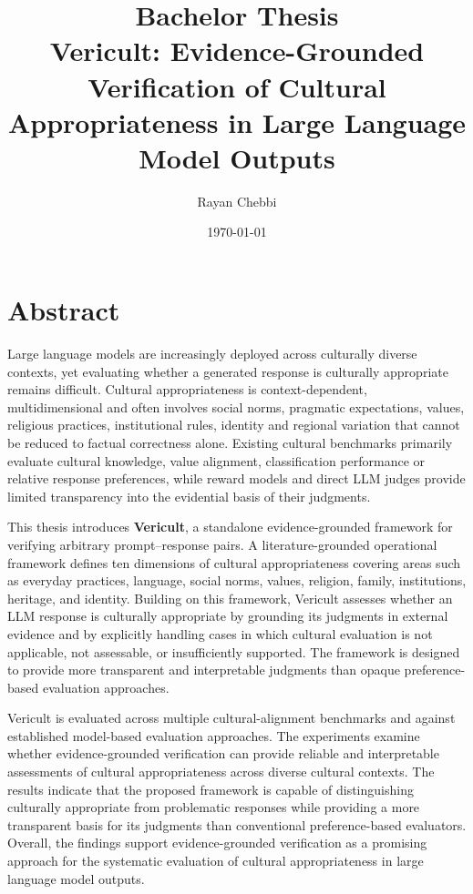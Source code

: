 \documentclass[11pt,a4paper,oneside]{report}
\title{\textbf{Bachelor Thesis}\\ Vericult: Evidence-Grounded Verification of Cultural Appropriateness in Large Language Model Outputs}
\author{Rayan Chebbi}
\date{\today}
\begin{document}




\chapter*{Abstract}
Large language models are increasingly deployed across culturally diverse contexts, yet evaluating whether a generated response is culturally appropriate remains difficult. Cultural appropriateness is context-dependent, multidimensional and often involves social norms, pragmatic expectations, values, religious practices, institutional rules, identity and regional variation that cannot be reduced to factual correctness alone. Existing cultural benchmarks primarily evaluate cultural knowledge, value alignment, classification performance or relative response preferences, while reward models and direct LLM judges provide limited transparency into the evidential basis of their judgments.

This thesis introduces \textbf{Vericult}, a standalone evidence-grounded framework for verifying arbitrary prompt--response pairs. A literature-grounded operational framework defines ten dimensions of cultural appropriateness covering areas such as everyday practices, language, social norms, values, religion, family, institutions, heritage, and identity. Building on this framework, Vericult assesses whether an LLM response is culturally appropriate by grounding its judgments in external evidence and by explicitly handling cases in which cultural evaluation is not applicable, not assessable, or insufficiently supported. The framework is designed to provide more transparent and interpretable judgments than opaque preference-based evaluation approaches.

Vericult is evaluated across multiple cultural-alignment benchmarks and against established model-based evaluation approaches. The experiments examine whether evidence-grounded verification can provide reliable and interpretable assessments of cultural appropriateness across diverse cultural contexts. The results indicate that the proposed framework is capable of distinguishing culturally appropriate from problematic responses while providing a more transparent basis for its judgments than conventional preference-based evaluators. Overall, the findings support evidence-grounded verification as a promising approach for the systematic evaluation of cultural appropriateness in large language model outputs.
\end{document}
